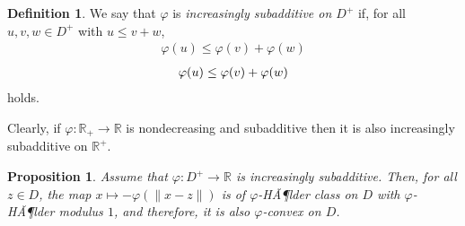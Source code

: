 \documentclass[12pt,leqno]{amsart}
\newtheorem{proposition}[theorem]{Proposition}
\newtheorem*{proposition*}{Proposition}
\theoremstyle{definition}
\newtheorem{definition}[theorem]{Definition}
\newtheorem*{definition*}{Definition}
\begin{document}
{
      {\begin{definition}\label{D{IS}}{
We say that $\varphi$ is \textit{increasingly subadditive on $D^+$} if,
for all $u,v,w\in D^+$ with $u\leq v+w$,
{
  {\begin{equation*}\begin{aligned}{
  \varphi(u)\leq\varphi(v)+\varphi(w)
}\end{aligned}\end{equation*}}
  {\begin{equation}\begin{aligned}\label{E{uvw}}{
  \varphi(u)\leq\varphi(v)+\varphi(w)
}\end{aligned}\end{equation}}}
holds.}\end{definition}}} Clearly, if $\varphi:{\mathbb{R}}_+\to {\mathbb{R}}$ is nondecreasing and subadditive then it is also
increasingly subadditive on ${\mathbb{R}}^+$.

{
             {\begin{proposition}\label{P{5}}{Assume that $\varphi:D^+\to {\mathbb{R}}$ is increasingly subadditive. Then, for all $z\in D$,
the map $x \mapsto -\varphi(\|x-z\|)$ is of $\varphi$-HÃ¶lder class on $D$ with
$\varphi$-HÃ¶lder modulus $1$, and therefore, it is also $\varphi$-convex on $D$.}\end{proposition}}}
\end{document}
